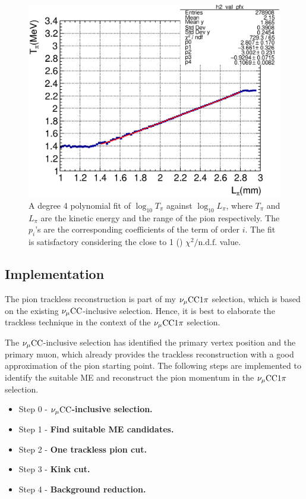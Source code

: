            \begin{figure}[h]
              \centering
              \includegraphics[width=\sgfidwid\textwidth]{figures/sel/pi_len_pi_len_vs_pi_ke_hist2d_al0_true_nokink.eps} 
              \caption{A degree 4 polynomial fit of $\log_{10}{T_\pi}$ against $\log_{10}{L_\pi}$, where $T_\pi$ and $L_\pi$ are the kinetic energy and the range of the pion respectively. The $p_i$'s are the corresponding coefficients of the term of order $i$. The fit is satisfactory considering the close to 1 () $\chi^2/\textrm{n.d.f.}$ value. }
              \label{fig:pi-mombr-fit}
           \end{figure}

        \subsection{Implementation}
        \label{sec:tl-imp}
            The pion trackless reconstruction is part of my $\nu_{\mu}\textrm{CC}1\pi$ selection, which is based on the existing $\nu_{\mu}\textrm{CC}$-inclusive selection. Hence, it is best to elaborate the trackless technique in the context of the $\nu_{\mu}\textrm{CC}1\pi$ selection. 
        
            The $\nu_{\mu}\textrm{CC}$-inclusive selection has identified the primary vertex position and the primary muon, which already provides the trackless reconstruction with a good approximation of the pion starting point. The following steps are implemented to identify the suitable ME and reconstruct the pion momentum in the $\nu_{\mu}\textrm{CC}1\pi$ selection. 

            \begin{itemize}
                \item Step 0 - \textbf{$\nu_{\mu}\textrm{CC}$-inclusive selection.}
                \item Step 1 - \textbf{Find suitable ME candidates.} 
                \item Step 2 - \textbf{One trackless pion cut.}
                \item Step 3 - \textbf{Kink cut.}
                \item Step 4 - \textbf{Background reduction.}
            \end{itemize}
        
